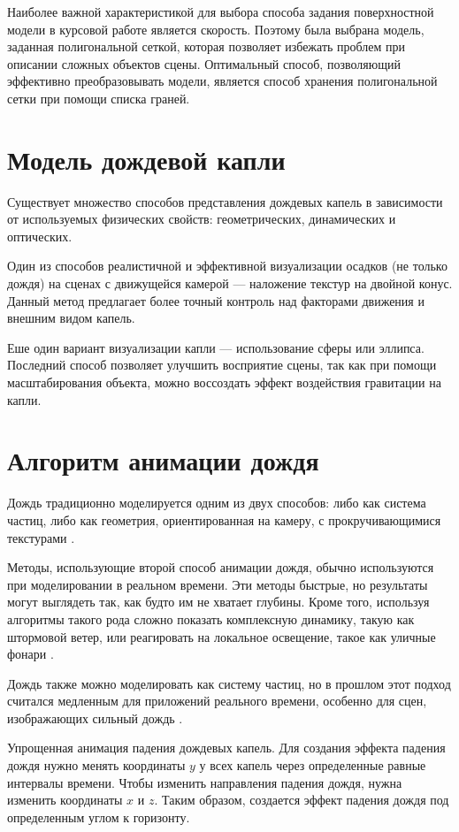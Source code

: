 Наиболее важной характеристикой для выбора способа задания поверхностной модели в курсовой работе является скорость. 
Поэтому была выбрана модель, заданная полигональной сеткой, которая позволяет избежать проблем при описании сложных объектов сцены. 
Оптимальный способ, позволяющий эффективно преобразовывать модели, является способ хранения полигональной сетки при помощи списка граней.

\section{Модель дождевой капли}
\label{sec:dropletmodel}

Существует множество способов представления дождевых капель в зависимости от используемых физических свойств: геометрических, динамических и оптических. 
    
Один из способов реалистичной и эффективной визуализации осадков (не только дождя) на сценах с движущейся камерой --- наложение текстур на двойной конус. 
Данный метод предлагает более точный контроль над факторами движения и внешним видом капель.

Еше один вариант визуализации капли --- использование сферы или эллипса. 
Последний способ позволяет улучшить восприятие сцены, так как при помощи масштабирования объекта, можно воссоздать эффект воздействия гравитации на капли.

\section{Алгоритм анимации дождя}

Дождь традиционно моделируется одним из двух способов: либо как система частиц, либо как геометрия, ориентированная на камеру, с прокручивающимися текстурами \cite[2]{Tariq2007}.

Методы, использующие второй способ анимации дождя, обычно используются при моделировании в реальном времени. 
Эти методы быстрые, но результаты могут выглядеть так, как будто им не хватает глубины. 
Кроме того, используя алгоритмы такого рода сложно показать комплексную динамику, такую как штормовой ветер, или реагировать на локальное освещение, такое как уличные фонари \cite[2]{Tariq2007}.

Дождь также можно моделировать как систему частиц, но в прошлом этот подход считался медленным для приложений реального времени, особенно для сцен, изображающих сильный дождь \cite[2]{Tariq2007}.

Упрощенная анимация падения дождевых капель. 
Для создания эффекта падения дождя нужно менять координаты $y$ у всех капель через определенные равные интервалы времени.
Чтобы изменить направления падения дождя, нужна изменить координаты $x$ и $z$. 
Таким образом, создается эффект падения дождя под определенным углом к горизонту.

